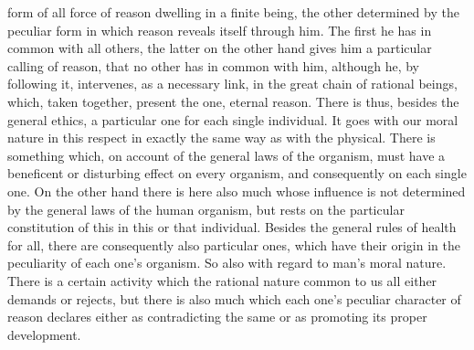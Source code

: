 \documentclass[12pt,a4paper,openany]{book}
\newcommand{\opage}[1]{\marginnote{\footnotesize\textit{[#1]}}}
\begin{document}
form of all force of reason dwelling in a finite being, the other determined by the
peculiar form in which reason reveals itself through him. The first he has in common
with all others, the latter on the other hand gives him a particular calling of
reason, that no other has in common with him, although he, by following it,
intervenes, as a necessary link, in the great chain of rational beings, which, taken
together, present the one, eternal reason. There
\setcounter{footnote}{0}%
\opage{85}is thus, besides the general ethics, a particular one for each single individual.
It goes with our moral nature in this respect in exactly the same way as with the
physical. There is something which, on account of the general laws of the organism,
must have a beneficent or disturbing effect on every organism, and consequently on
each single one. On the other hand there is here also much whose influence is not
determined by the general laws of the human organism, but rests on the particular
constitution of this in this or that individual. Besides the general rules of health
for all, there are consequently also particular ones, which have their origin in the
peculiarity of each one's organism. So also with regard to man's moral nature. There
is a certain activity which the rational nature common to us all either demands or
rejects, but there is also much which each one's peculiar character of reason
declares either as contradicting the same or as promoting its proper development.
\end{document}

